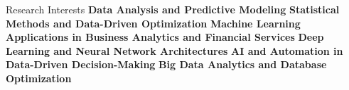 \begin{rubric}{Research Interests}
\entry* \textbf{Data Analysis and Predictive Modeling}
\entry* \textbf{Statistical Methods and Data-Driven Optimization}
\entry* \textbf{Machine Learning Applications in Business Analytics and Financial Services}
\entry* \textbf{Deep Learning and Neural Network Architectures}
\entry* \textbf{AI and Automation in Data-Driven Decision-Making}
\entry* \textbf{Big Data Analytics and Database Optimization}
\end{rubric}